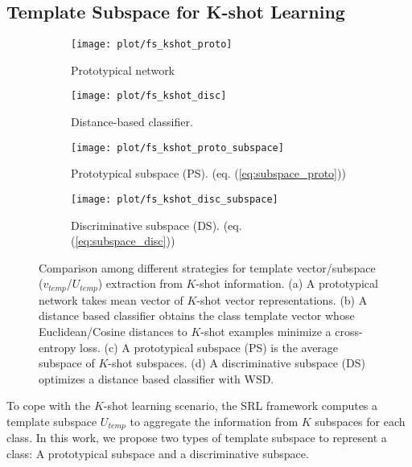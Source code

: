 \subsection{Template Subspace for K-shot Learning}
\label{sec:kshot}

\begin{figure*}[t]
\centering
  \begin{subfigure}[b]{0.35\textwidth}
         \centering
         \texttt{[image: plot/fs\_kshot\_proto]}
         \caption{Prototypical network \cite{snell2017prototypical}}
         \label{fig:kshot_proto}
     \end{subfigure}
     \hspace{5em}
     \begin{subfigure}[b]{0.35\textwidth}
         \centering
         \texttt{[image: plot/fs\_kshot\_disc]}
         \caption{Distance-based classifier. \cite{chen2019closer}}
         \label{fig:kshot_dist}
     \end{subfigure}
     \par\bigskip
     \begin{subfigure}[b]{0.35\textwidth}
         \centering
         \texttt{[image: plot/fs\_kshot\_proto\_subspace]}
         \caption{Prototypical subspace (PS). (eq. (\ref{eq:subspace_proto}))}
         \label{fig:kshot_proto_subspace}
     \end{subfigure}
     \hspace{5em}
     \begin{subfigure}[b]{0.35\textwidth}
         \centering
         \texttt{[image: plot/fs\_kshot\_disc\_subspace]}
         \caption{Discriminative subspace (DS). (eq. (\ref{eq:subspace_disc}))}
         \label{fig:kshot_disc_subspace}
     \end{subfigure}
     \caption{Comparison among different strategies for template vector/subspace ($v_{temp}$/$U_{temp}$) extraction from $K$-shot information. (a) A prototypical network takes mean vector of $K$-shot vector representations. (b) A distance based classifier obtains the class template vector whose Euclidean/Cosine distances to $K$-shot examples minimize a cross-entropy loss. (c) A prototypical subspace (PS) is the average subspace of $K$-shot subspaces. (d) A discriminative subspace (DS) optimizes a distance based classifier with WSD.}
     \label{fig:kshot}
\end{figure*}

To cope with the $K$-shot learning scenario, the SRL framework computes a template subspace $U_{temp}$ to aggregate the information from $K$ subspaces for each class.
In this work, we propose two types of template subspace to represent a class: A prototypical subspace and a discriminative subspace.

